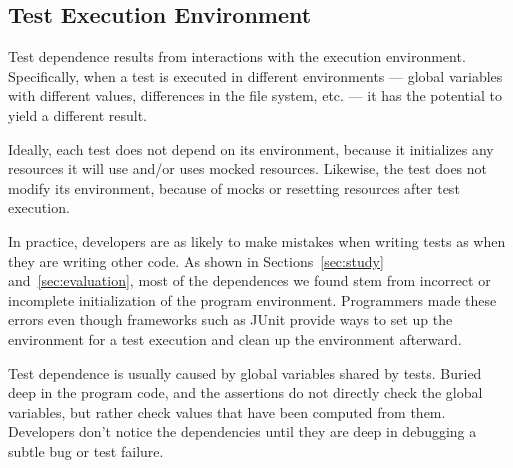 \subsection{Test Execution Environment}

Test dependence results from interactions with the execution environment.
Specifically, when a
test is executed in different environments --- global variables
with different values, differences in the file system, etc. --- it has the
potential to yield
a different result.  

Ideally, each test does not depend on its environment, because it
initializes any resources it will use and/or uses mocked resources.
Likewise, the test does not modify its environment, because of mocks or
resetting resources after test execution.

In practice, developers are as likely
to make mistakes when writing tests as when they are writing other code.
As shown in Sections~\ref{sec:study} and~\ref{sec:evaluation}, most of the dependences we found
stem from incorrect or incomplete initialization
of the program environment.
Programmers made these errors even though frameworks such as
JUnit provide ways to set up the environment for a test execution and clean
up the environment afterward.




Test dependence is usually caused by
global variables shared by tests.
Buried deep in the program code, and the assertions
do not directly check the global variables,
but rather check values that have been computed from
them.
Developers don't notice the dependencies until they are deep in debugging a
subtle bug or test failure.


